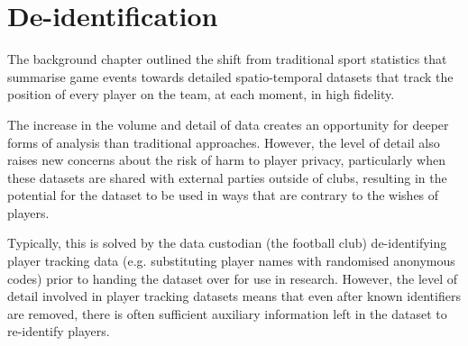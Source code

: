 \chapter{De-identification}
\label{ch:de-identification}
\startchapter




The background chapter outlined the shift from traditional sport statistics that summarise game events towards detailed spatio-temporal datasets that track the position of every player on the team, at each moment, in high fidelity.

The increase in the volume and detail of data creates an opportunity for deeper forms of analysis than traditional approaches. However, the level of detail also raises new concerns about the risk of harm to player privacy, particularly when these datasets are shared with external parties outside of clubs, resulting in the potential for the dataset to be used in ways that are contrary to the wishes of players.

Typically, this is solved by the data custodian (the football club) de-identifying player tracking data (e.g. substituting player names with randomised anonymous codes) prior to handing the dataset over for use in research. However, the level of detail involved in player tracking datasets means that even after known identifiers are removed, there is often sufficient auxiliary information left in the dataset to re-identify players.

